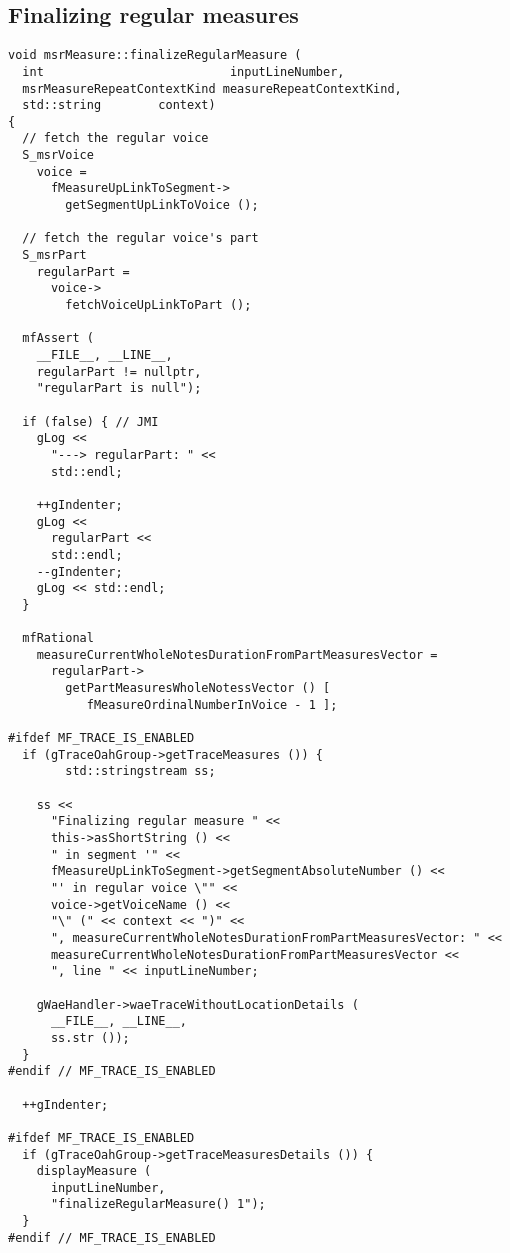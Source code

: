 \subsection{Finalizing regular measures}

\begin{lstlisting}[language=CPlusPlus]
void msrMeasure::finalizeRegularMeasure (
  int                          inputLineNumber,
  msrMeasureRepeatContextKind measureRepeatContextKind,
  std::string        context)
{
  // fetch the regular voice
  S_msrVoice
    voice =
      fMeasureUpLinkToSegment->
        getSegmentUpLinkToVoice ();

  // fetch the regular voice's part
  S_msrPart
    regularPart =
      voice->
        fetchVoiceUpLinkToPart ();

  mfAssert (
    __FILE__, __LINE__,
    regularPart != nullptr,
    "regularPart is null");

  if (false) { // JMI
    gLog <<
      "---> regularPart: " <<
      std::endl;

    ++gIndenter;
    gLog <<
      regularPart <<
      std::endl;
    --gIndenter;
    gLog << std::endl;
  }

  mfRational
    measureCurrentWholeNotesDurationFromPartMeasuresVector =
      regularPart->
        getPartMeasuresWholeNotessVector () [
           fMeasureOrdinalNumberInVoice - 1 ];

#ifdef MF_TRACE_IS_ENABLED
  if (gTraceOahGroup->getTraceMeasures ()) {
		std::stringstream ss;

    ss <<
      "Finalizing regular measure " <<
      this->asShortString () <<
      " in segment '" <<
      fMeasureUpLinkToSegment->getSegmentAbsoluteNumber () <<
      "' in regular voice \"" <<
      voice->getVoiceName () <<
      "\" (" << context << ")" <<
      ", measureCurrentWholeNotesDurationFromPartMeasuresVector: " <<
      measureCurrentWholeNotesDurationFromPartMeasuresVector <<
      ", line " << inputLineNumber;

    gWaeHandler->waeTraceWithoutLocationDetails (
      __FILE__, __LINE__,
      ss.str ());
  }
#endif // MF_TRACE_IS_ENABLED

  ++gIndenter;

#ifdef MF_TRACE_IS_ENABLED
  if (gTraceOahGroup->getTraceMeasuresDetails ()) {
    displayMeasure (
      inputLineNumber,
      "finalizeRegularMeasure() 1");
  }
#endif // MF_TRACE_IS_ENABLED


\end{lstlisting}
